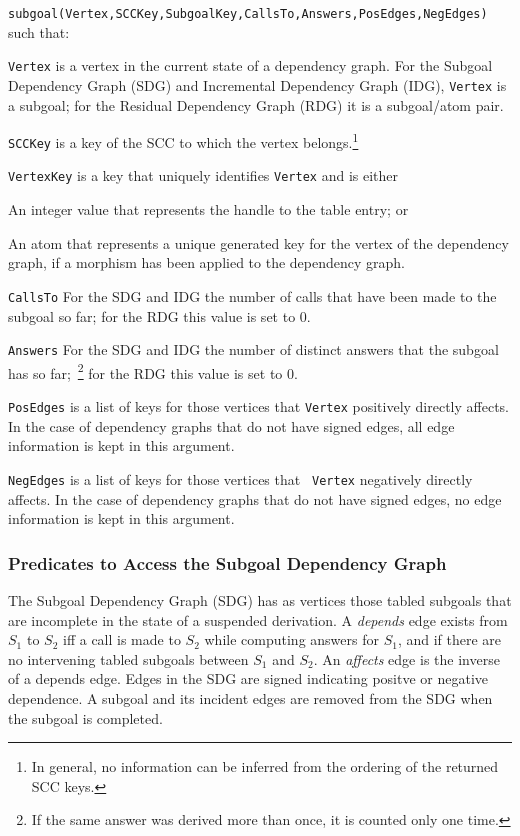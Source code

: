 {\small
\noindent
{\tt subgoal(Vertex,SCCKey,SubgoalKey,CallsTo,Answers,PosEdges,NegEdges)} 
}
such that:

\bi
\item {\tt Vertex} is a vertex in the current state of a dependency
  graph.  For the Subgoal Dependency Graph (SDG) and Incremental
  Dependency Graph (IDG), {\tt Vertex} is a subgoal; for the Residual
  Dependency Graph (RDG) it is a subgoal/atom pair.
\item {\tt SCCKey} is a key of the SCC to which the vertex
  belongs.\footnote{In general, no information can be inferred from
    the ordering of the returned SCC keys.}
\item {\tt VertexKey} is a key that uniquely identifies {\tt Vertex}
  and is either 
%
\bi
  \item An integer value that represents the handle to the table
    entry; or 
  \item An atom that represents a unique generated key for the vertex of
    the dependency graph, if a morphism has been applied to the
    dependency graph.  \ei
\item {\tt CallsTo} For the SDG and IDG the number of calls that have
  been made to the subgoal so far; for the RDG this value is set to 0.
\item {\tt Answers} For the SDG and IDG the number of distinct answers
  that the subgoal has so far;~\footnote{If the same answer was
    derived more than once, it is counted only one time.} for the RDG
  this value is set to 0.
\item {\tt PosEdges} is a list of keys for those vertices that {\tt Vertex}
  positively directly affects.  In the case of dependency graphs that
  do not have signed edges, all edge information is kept in this
  argument.
\item {\tt NegEdges} is a list of keys for those vertices that {\tt
  Vertex} negatively directly affects.  In the case of dependency
  graphs that do not have signed edges, no edge information is kept in
  this argument.  \ei

\subsubsection{Predicates to Access the Subgoal Dependency Graph} \label{sec:sdg-preds}

The Subgoal Dependency Graph (SDG) has as vertices those tabled
subgoals that are incomplete in the state of a suspended derivation.
A {\em depends} edge exists from $S_1$ to $S_2$ iff a call is made to
$S_2$ while computing answers for $S_1$, and if there are no
intervening tabled subgoals between $S_1$ and $S_2$.  An {\em affects}
edge is the inverse of a depends edge.  Edges in the SDG are signed
indicating positve or negative dependence.  A subgoal and its incident
edges are removed from the SDG when the subgoal is completed.

